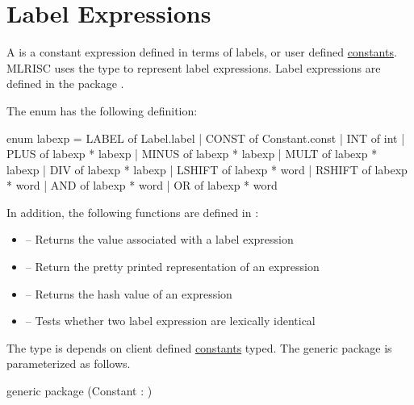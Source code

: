 \section{Label Expressions}

A  is a constant
expression defined in terms of labels, or user 
defined \href{constants.html}{constants}.  MLRISC uses the type
 to represent label expressions.  Label expressions
are defined in the package 
.

The enum  has the following definition:
\begin{SML}
  enum labexp = 
      LABEL of Label.label
    | CONST of Constant.const
    | INT of int
    | PLUS of labexp * labexp
    | MINUS of labexp * labexp
    | MULT of labexp * labexp
    | DIV of labexp * labexp
    | LSHIFT of labexp * word
    | RSHIFT of labexp * word
    | AND of labexp * word
    | OR of labexp * word
\end{SML}

In addition, the following functions are defined in :
\begin{itemize}
  \item {}  -- Returns the value associated with
a label expression
  \item {} -- Return the pretty printed representation of an expression
  \item {} -- Returns the hash value of an expression
  \item {} -- Tests whether two label expression are lexically identical
\end{itemize}

The type  is depends on client defined 
\href{constants.html}{constants} typed.  The generic package 
is parameterized as follows.
\begin{SML}
   generic package (Constant : )
\end{SML}
